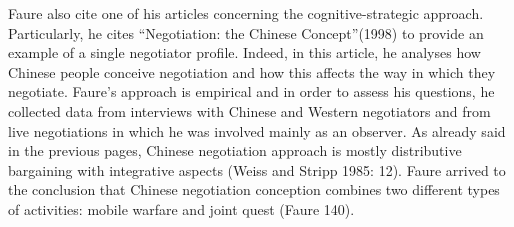 \documentclass[../main.tex]{subfiles}
\begin{document}
\begin{minipage}{\linewidth}%
    \label{faureTable}
\end{minipage}

\pagebreak
Faure also cite one of his articles concerning the cognitive-strategic approach. Particularly, he cites “Negotiation: the Chinese Concept”(1998)\cite{faure1} to provide an example of a single negotiator profile. Indeed, in this article, he analyses how Chinese people conceive negotiation and how this affects the way in which they negotiate. Faure's approach is empirical and in order to assess his questions, he collected data from interviews with Chinese and Western negotiators and from live negotiations in which he was involved mainly as an observer. As already said in the previous pages, Chinese negotiation approach is mostly distributive bargaining with integrative aspects (Weiss and Stripp 1985: 12). Faure arrived to the conclusion that Chinese negotiation conception combines two different types of activities: mobile warfare and joint quest (Faure 140).
\end{document}
